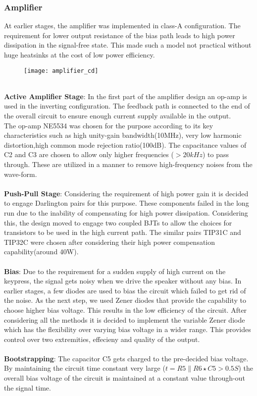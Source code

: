 \subsubsection{Amplifier}
At earlier stages, the amplifier was implemented in class-A configuration. The requirement for lower output resistance of the bias path leads to high power dissipation in the signal-free state. This made such a model not practical without huge heatsinks at the cost of low power efficiency.
\begin{figure}[h]
    \begin{center}
        \texttt{[image: amplifier\_cd]}
    \end{center}
\end{figure}
\\
\textbf{Active Amplifier Stage}: In the first part of the amplifier design an op-amp is used in the inverting configuration. The feedback path is connected to the end of the overall circuit to ensure enough current supply available in the output.\\
The op-amp NE5534 was chosen for the purpose according to its key characteristics such as high unity-gain bandwidth(10MHz), very low harmonic distortion,high common mode rejection ratio(100dB). The capacitance values of C2 and C3 are chosen to allow only higher frequencies ($>20kHz$) to pass through. These are utilized in a manner to remove high-frequency noises from the wave-form.
\\
\\
\textbf{Push-Pull Stage}: Considering the requirement of high power gain it is decided to engage Darlington pairs for this purpose. These components failed in the long run due to the inability of compensating for high power dissipation. Considering this, the design moved to engage two coupled BJTs to allow the choices for transistors to be used in the high current path. The similar pairs TIP31C and TIP32C were chosen after considering their high power compensation capability(around 40W).
\\
\\
\textbf{Bias}: Due to the requirement for a sudden supply of high current on the keypress, the signal gets noisy when we drive the speaker without any bias. In earlier stages, a few diodes are used to bias the circuit which failed to get rid of the noise. As the next step, we used Zener diodes that provide the capability to choose higher bias voltage. This results in the low efficiency of the circuit.
After considering all the methods it is decided to implement the variable Zener diode which has the flexibility over varying bias voltage in a wider range. This provides control over two extremities, effecieny and quality of the output.
\\
\\
\textbf{Bootstrapping}: The capacitor C5 gets charged to the pre-decided bias voltage.  By maintaining the circuit time constant very large ($t=R5\parallel R6\star C5>0.5S$) the overall bias voltage of the circuit is maintained at a constant value through-out the signal time.

